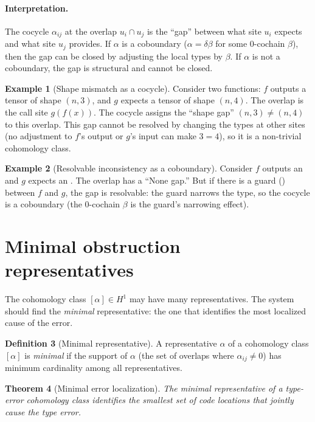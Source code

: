 \documentclass[11pt]{report}
\DeclareRobustCommand{\py}[1]{\texttt{\detokenize{#1}}}
\theoremstyle{definition}
\newtheorem{definition}{Definition}[section]
\newtheorem{example}[definition]{Example}
\theoremstyle{plain}
\newtheorem{theorem}[definition]{Theorem}
\begin{document}
\paragraph{Interpretation.}
The cocycle $\alpha_{ij}$ at the overlap $u_i \cap u_j$ is the ``gap''
between what site $u_i$ expects and what site $u_j$ provides. If $\alpha$ is
a coboundary ($\alpha = \delta \beta$ for some 0-cochain $\beta$), then the
gap can be closed by adjusting the local types by $\beta$. If $\alpha$ is
not a coboundary, the gap is structural and cannot be closed.

\begin{example}[Shape mismatch as a cocycle]
Consider two functions: $f$ outputs a tensor of shape $(n, 3)$, and $g$
expects a tensor of shape $(n, 4)$. The overlap is the call site
$g(f(x))$. The cocycle assigns the ``shape gap'' $(n, 3) \neq (n, 4)$ to
this overlap. This gap cannot be resolved by changing the types at other
sites (no adjustment to $f$'s output or $g$'s input can make $3 = 4$), so
it is a non-trivial cohomology class.
\end{example}

\begin{example}[Resolvable inconsistency as a coboundary]
Consider $f$ outputs an \py{int | None} and $g$ expects an \py{int}. The
overlap has a ``None gap.'' But if there is a guard (\py{if x is not None})
between $f$ and $g$, the gap is resolvable: the guard narrows the type,
so the cocycle is a coboundary (the 0-cochain $\beta$ is the guard's
narrowing effect).
\end{example}

\section{Minimal obstruction representatives}

The cohomology class $[\alpha] \in H^1$ may have many representatives.
The system should find the \emph{minimal} representative: the one that
identifies the most localized cause of the error.

\begin{definition}[Minimal representative]
A representative $\alpha$ of a cohomology class $[\alpha]$ is
\emph{minimal} if the support of $\alpha$ (the set of overlaps where
$\alpha_{ij} \neq 0$) has minimum cardinality among all representatives.
\end{definition}

\begin{theorem}[Minimal error localization]
The minimal representative of a type-error cohomology class identifies the
smallest set of code locations that jointly cause the type error.
\end{theorem}
\end{document}
